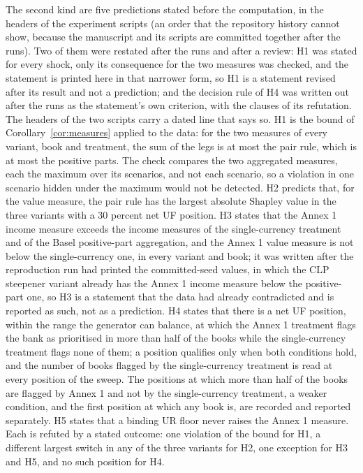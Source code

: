 The second kind are five predictions stated before the computation, in the headers of the experiment scripts (an order that the repository history cannot show, because the manuscript and its scripts are committed together after the runs). Two of them were restated after the runs and after a review: H1 was stated for every shock, only its consequence for the two measures was checked, and the statement is printed here in that narrower form, so H1 is a statement revised after its result and not a prediction; and the decision rule of H4 was written out after the runs as the statement's own criterion, with the clauses of its refutation. The headers of the two scripts carry a dated line that says so. H1 is the bound of Corollary~\ref{cor:measures} applied to the data: for the two measures of every variant, book and treatment, the sum of the legs is at most the pair rule, which is at most the positive parts. The check compares the two aggregated measures, each the maximum over its scenarios, and not each scenario, so a violation in one scenario hidden under the maximum would not be detected. H2 predicts that, for the value measure, the pair rule has the largest absolute Shapley value in the three variants with a 30 percent net UF position. H3 states that the Annex 1 income measure exceeds the income measures of the single-currency treatment and of the Basel positive-part aggregation, and the Annex 1 value measure is not below the single-currency one, in every variant and book; it was written after the reproduction run had printed the committed-seed values, in which the CLP steepener variant already has the Annex 1 income measure below the positive-part one, so H3 is a statement that the data had already contradicted and is reported as such, not as a prediction. H4 states that there is a net UF position, within the range the generator can balance, at which the Annex 1 treatment flags the bank as prioritised in more than half of the books while the single-currency treatment flags none of them; a position qualifies only when both conditions hold, and the number of books flagged by the single-currency treatment is read at every position of the sweep. The positions at which more than half of the books are flagged by Annex 1 and not by the single-currency treatment, a weaker condition, and the first position at which any book is, are recorded and reported separately. H5 states that a binding UR floor never raises the Annex 1 measure. Each is refuted by a stated outcome: one violation of the bound for H1, a different largest switch in any of the three variants for H2, one exception for H3 and H5, and no such position for H4.

